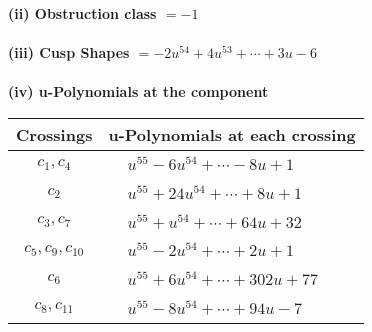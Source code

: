 \documentclass[1p]{elsarticle_modified}
\theoremstyle{definition}
\begin{document}
\flushleft \textbf{(ii) Obstruction class $= -1$}\\~\\
\flushleft \textbf{(iii) Cusp Shapes $= -2 u^{54}+4 u^{53}+\cdots+3 u-6$}\\~\\
\newpage\renewcommand{\arraystretch}{1}
\flushleft \textbf{(iv) u-Polynomials at the component}\newline \\
\begin{tabular}{m{50pt}|m{274pt}}
Crossings & \hspace{64pt}u-Polynomials at each crossing \\
\hline $$\begin{aligned}c_{1},c_{4}\end{aligned}$$&$\begin{aligned}
&u^{55}-6 u^{54}+\cdots-8 u+1
\end{aligned}$\\
\hline $$\begin{aligned}c_{2}\end{aligned}$$&$\begin{aligned}
&u^{55}+24 u^{54}+\cdots+8 u+1
\end{aligned}$\\
\hline $$\begin{aligned}c_{3},c_{7}\end{aligned}$$&$\begin{aligned}
&u^{55}+u^{54}+\cdots+64 u+32
\end{aligned}$\\
\hline $$\begin{aligned}c_{5},c_{9},c_{10}\end{aligned}$$&$\begin{aligned}
&u^{55}-2 u^{54}+\cdots+2 u+1
\end{aligned}$\\
\hline $$\begin{aligned}c_{6}\end{aligned}$$&$\begin{aligned}
&u^{55}+6 u^{54}+\cdots+302 u+77
\end{aligned}$\\
\hline $$\begin{aligned}c_{8},c_{11}\end{aligned}$$&$\begin{aligned}
&u^{55}-8 u^{54}+\cdots+94 u-7
\end{aligned}$\\
\hline
\end{tabular}\\~\\
\end{document}
